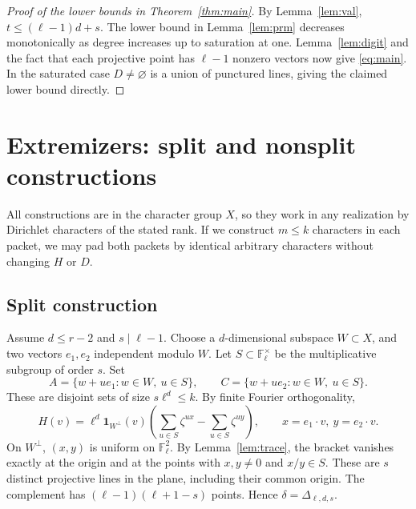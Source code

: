 \documentclass[11pt]{article}
\theoremstyle{remark}\newtheorem{remark}[theorem]{Remark}
\newcommand{\F}{\mathbb F}
\newcommand{\ind}{\mathbf 1}
\begin{document}
\begin{proof}[Proof of the lower bounds in Theorem~\ref{thm:main}]
By Lemma~\ref{lem:val}, $t\le(\ell-1)d+s$. The lower bound in Lemma~\ref{lem:prm} decreases monotonically as degree increases up to saturation at one. Lemma~\ref{lem:digit} and the fact that each projective point has $\ell-1$ nonzero vectors now give \eqref{eq:main}. In the saturated case $D\ne\varnothing$ is a union of punctured lines, giving the claimed lower bound directly.
\end{proof}

\section{Extremizers: split and nonsplit constructions}
All constructions are in the character group $X$, so they work in any realization by Dirichlet characters of the stated rank. If we construct $m\le k$ characters in each packet, we may pad both packets by identical arbitrary characters without changing $H$ or $D$.

\subsection{Split construction}
Assume $d\le r-2$ and $s\mid\ell-1$. Choose a $d$-dimensional subspace $W\subset X$, and two vectors $e_1,e_2$ independent modulo $W$. Let $S\subset\F_\ell^\times$ be the multiplicative subgroup of order $s$. Set
\[
 A=\{w+u e_1:w\in W,\ u\in S\},\qquad C=\{w+u e_2:w\in W,\ u\in S\}.
\]
These are disjoint sets of size $s\ell^d\le k$. By finite Fourier orthogonality,
\[
 H(v)=\ell^d\ind_{W^\perp}(v)\left(\sum_{u\in S}\zeta^{u x}-\sum_{u\in S}\zeta^{u y}\right),\qquad x=e_1\cdot v,\ y=e_2\cdot v.
\]
On $W^\perp$, $(x,y)$ is uniform on $\F_\ell^2$. By Lemma~\ref{lem:trace}, the bracket vanishes exactly at the origin and at the points with $x,y\ne0$ and $x/y\in S$. These are $s$ distinct projective lines in the plane, including their common origin. The complement has $(\ell-1)(\ell+1-s)$ points. Hence $\delta=\Delta_{\ell,d,s}$.
\end{document}
